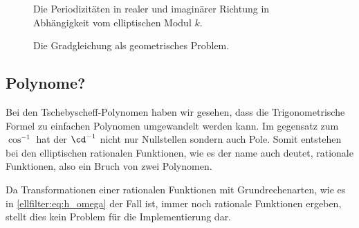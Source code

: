 \begin{figure}
    \centering
    
    \caption{Die Periodizitäten in realer und imaginärer Richtung in Abhängigkeit vom elliptischen Modul $k$.}
\end{figure}

\begin{figure}
    \centering
    
    \caption{Die Gradgleichung als geometrisches Problem.}
\end{figure}



\subsection{Polynome?}

Bei den Tschebyscheff-Polynomen haben wir gesehen, dass die Trigonometrische Formel zu einfachen Polynomen umgewandelt werden kann.
Im gegensatz zum $\cos^{-1}$ hat der $\cd^{-1}$ nicht nur Nullstellen sondern auch Pole.
Somit entstehen bei den elliptischen rationalen Funktionen, wie es der name auch deutet, rationale Funktionen, also ein Bruch von zwei Polynomen.

Da Transformationen einer rationalen Funktionen mit Grundrechenarten, wie es in \eqref{ellfilter:eq:h_omega} der Fall ist, immer noch rationale Funktionen ergeben, stellt dies kein Problem für die Implementierung dar.
